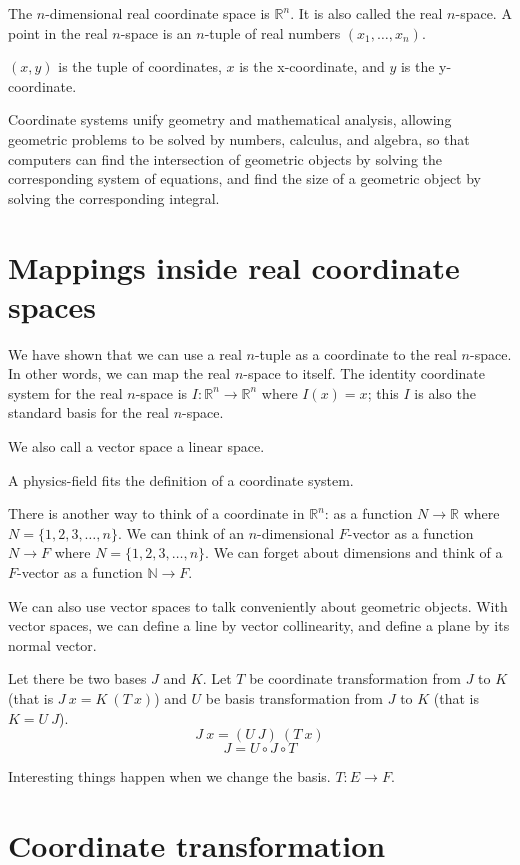 The \(n\)-dimensional real coordinate space is $\mathbb{R}^n$.
It is also called the real $n$-space.
A point in the real $n$-space is an $n$-tuple of real numbers $(x_1,\ldots,x_n)$.

$(x,y)$ is the tuple of coordinates,
$x$ is the x-coordinate, and $y$ is the y-coordinate.

Coordinate systems unify geometry and
mathematical analysis,
allowing geometric problems to be solved by
numbers, calculus, and algebra,
so that computers can
find the intersection of geometric objects
by solving the corresponding system of equations,
and find the size of a geometric object by solving the corresponding integral.

\section{Mappings inside real coordinate spaces}

We have shown that we can use a real $n$-tuple as a coordinate to the real $n$-space.
In other words, we can map the real $n$-space to itself.
The identity coordinate system for the real $n$-space is
$I : \mathbb{R}^n \to \mathbb{R}^n$ where $I(x) = x$;
this $I$ is also the standard basis for the real $n$-space.

We also call a vector space a linear space.

A physics-field fits the definition of a coordinate system.

There is another way to think of a coordinate in $\mathbb{R}^n$:
as a function $N \to \mathbb{R}$ where $N = \{1,2,3,\ldots,n\}$.
We can think of an $n$-dimensional $F$-vector as a function $N \to F$ where $N = \{1,2,3,\ldots,n\}$.
We can forget about dimensions and think of a $F$-vector as a function $\mathbb{N} \to F$.

We can also use vector spaces to talk conveniently about geometric objects.
With vector spaces, we can define a line by vector collinearity,
and define a plane by its normal vector.

Let there be two bases $J$ and $K$.
Let $T$ be coordinate transformation from $J$ to $K$
(that is $J~x = K~(T~x)$)
and $U$ be basis transformation from $J$ to $K$
(that is $K = U~J$).
\[
J~x = (U~J)~(T~x)
\]
\[
J = U \circ J \circ T
\]

Interesting things happen when we change the basis.
$T : E \to F$.

\section{Coordinate transformation}

